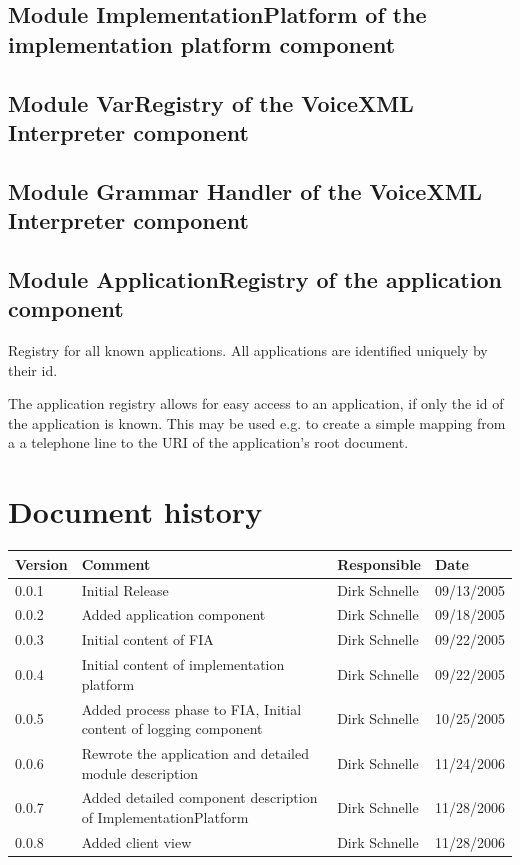 \documentclass[11pt,a4paper]{article}
\begin{document}
\subsection{Module ImplementationPlatform of the implementation platform 
component}


\subsection{Module VarRegistry of the VoiceXML Interpreter component}
\label{sec:module-varr-voic}

\subsection{Module Grammar Handler of the 
VoiceXML Interpreter component}

\subsection{Module ApplicationRegistry of the application component}

Registry for all known applications. All applications are identified
uniquely by their id.

The application registry allows for easy access to an application,
if only the id of the application is known. This may be used e.g. to
create a simple mapping from a a telephone line to the URI of the
application's root document.


\section*{Document history}

\begin{tabular}{|l|p{5cm}|l|l|}
\hline
\textbf{Version} & \textbf{Comment} & \textbf{Responsible} & \textbf{Date} \\
\hline
\hline
0.0.1 & Initial Release & Dirk Schnelle & 09/13/2005 \\
\hline
0.0.2 & Added application component & Dirk Schnelle & 09/18/2005 \\
\hline
0.0.3 & Initial content of FIA & Dirk Schnelle & 09/22/2005 \\
\hline
0.0.4 & Initial content of implementation platform & Dirk Schnelle & 09/22/2005 \\
\hline
0.0.5 & Added process phase to FIA, Initial content of logging component & 
Dirk Schnelle & 10/25/2005 \\
\hline
0.0.6 & Rewrote the application and detailed module description & 
Dirk Schnelle & 11/24/2006 \\
\hline
0.0.7 & Added detailed component description of ImplementationPlatform & 
Dirk Schnelle & 11/28/2006 \\
\hline
0.0.8 & Added client view & 
Dirk Schnelle & 11/28/2006 \\
\hline
\end{tabular}



\end{document}
